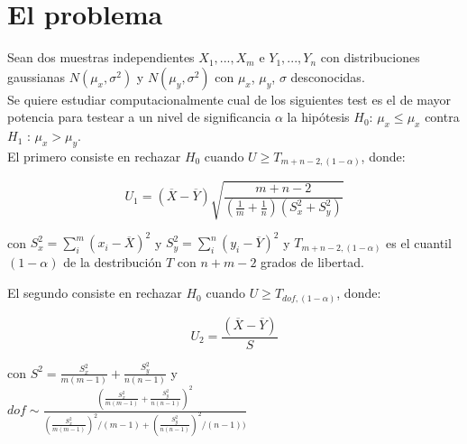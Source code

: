 \documentclass[%
 reprint,
 amsmath,amssymb,
 aps,
spanish]{revtex4-1}
\begin{document}
\section{El problema}
Sean dos muestras independientes $X_1,...,X_m$ e $Y_1,...,Y_n$ con distribuciones gaussianas $N(\mu_x, \sigma^2)$ y $N(\mu_y, \sigma^2)$ con $\mu_x$, $\mu_y$, $\sigma$ desconocidas.\\
Se quiere estudiar computacionalmente cual de los siguientes test es el de mayor potencia para testear a un nivel de significancia $\alpha$ la hipótesis $H_0$: $\mu_x \leq \mu_x$ contra $H_1$ : 
$\mu_x > \mu_y$.\\
El primero consiste en rechazar $H_0$ cuando $U \geq T_{m+n-2, (1-\alpha)}$, donde:

\begin{equation}
U_1=(\overline{X}-\overline{Y})\sqrt{\frac{m+n-2}{ (\frac{1}{m}+\frac{1}{n})(S_x^2 + S_y^2)  }}
\label{U1}
\end{equation}

con $S_x^2 = \sum_i^m (x_i-\overline{X})^2$ y $S_y^2 = \sum_i^n (y_i-\overline{Y})^2$ y $T_{m+n-2, (1-\alpha)}$ es el cuantil $(1-\alpha)$ de la destribución $T$ con $n+m-2$ grados de libertad.

El segundo consiste en rechazar $H_0$ cuando $U \geq T_{dof, (1-\alpha)}$, donde:

\begin{equation}
U_2=\frac{(\overline{X}-\overline{Y})}{S}
\label{U2}
\end{equation}

con $S^2 = \frac{S_x^2}{m(m-1)} + \frac{S_y^2}{n(n-1)}$ y \\$dof \sim \frac{(\frac{S_x^2}{m(m-1)} + \frac{S_y^2}{n(n-1)})^2}{(\frac{S_x^2}{m(m-1)})^2/(m-1)+(\frac{S_y^2}{n(n-1)})^2/(n-1))}$
\end{document}
